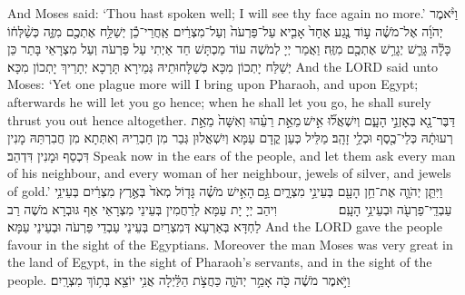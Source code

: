 {{And Moses said: ‘Thou hast spoken well; I will see thy face again no more.’}{}
\newperek
{}%
{וַיֹּ֨אמֶר יְהֹוָ֜ה אֶל־מֹשֶׁ֗ה ע֣וֹד נֶ֤גַע אֶחָד֙ אָבִ֤יא עַל־פַּרְעֹה֙ וְעַל־מִצְרַ֔יִם אַֽחֲרֵי־כֵ֕ן יְשַׁלַּ֥ח אֶתְכֶ֖ם מִזֶּ֑ה כְּשַׁ֨לְּח֔וֹ כָּלָ֕ה גָּרֵ֛שׁ יְגָרֵ֥שׁ אֶתְכֶ֖ם מִזֶּֽה׃
}
{וַאֲמַר יְיָ לְמֹשֶׁה עוֹד מַכְתָּשׁ חַד אַיְתִי עַל פַּרְעֹה וְעַל מִצְרָאֵי בָּתַר כֵּן יְשַׁלַּח יָתְכוֹן מִכָּא כְּשַׁלָּחוּתֵיהּ גְּמֵירָא תָּרָכָא יְתָרֵיךְ יָתְכוֹן מִכָּא׃}
{And the LORD said unto Moses: ‘Yet one plague more will I bring upon Pharaoh, and upon Egypt; afterwards he will let you go hence; when he shall let you go, he shall surely thrust you out hence altogether.}{}
{דַּבֶּר־נָ֖א בְּאׇזְנֵ֣י הָעָ֑ם וְיִשְׁאֲל֞וּ אִ֣ישׁ \legarmeh  מֵאֵ֣ת רֵעֵ֗הוּ וְאִשָּׁה֙ מֵאֵ֣ת רְעוּתָ֔הּ כְּלֵי־כֶ֖סֶף וּכְלֵ֥י זָהָֽב׃
}
{מַלֵּיל כְּעַן קֳדָם עַמָּא וְיִשְׁאֲלוּן גְּבַר מִן חַבְרֵיהּ וְאִתְּתָא מִן חֲבִרְתַּהּ מָנִין דִּכְסַף וּמָנִין דִּדְהַב׃}
{Speak now in the ears of the people, and let them ask every man of his neighbour, and every woman of her neighbour, jewels of silver, and jewels of gold.’}{}
{וַיִּתֵּ֧ן יְהֹוָ֛ה אֶת־חֵ֥ן הָעָ֖ם בְּעֵינֵ֣י מִצְרָ֑יִם גַּ֣ם \legarmeh  הָאִ֣ישׁ מֹשֶׁ֗ה גָּד֤וֹל מְאֹד֙ בְּאֶ֣רֶץ מִצְרַ֔יִם בְּעֵינֵ֥י עַבְדֵֽי־פַרְעֹ֖ה וּבְעֵינֵ֥י הָעָֽם׃ \setuma         }
{וִיהַב יְיָ יָת עַמָּא לְרַחֲמִין בְּעֵינֵי מִצְרָאֵי אַף גּוּבְרָא מֹשֶׁה רַב לַחְדָּא בְּאַרְעָא דְּמִצְרַיִם בְּעֵינֵי עַבְדֵי פַּרְעֹה וּבְעֵינֵי עַמָּא׃}
{And the LORD gave the people favour in the sight of the Egyptians. Moreover the man Moses was very great in the land of Egypt, in the sight of Pharaoh’s servants, and in the sight of the people.}{}
{וַיֹּ֣אמֶר מֹשֶׁ֔ה כֹּ֖ה אָמַ֣ר יְהֹוָ֑ה כַּחֲצֹ֣ת הַלַּ֔יְלָה אֲנִ֥י יוֹצֵ֖א בְּת֥וֹךְ מִצְרָֽיִם׃
}}
